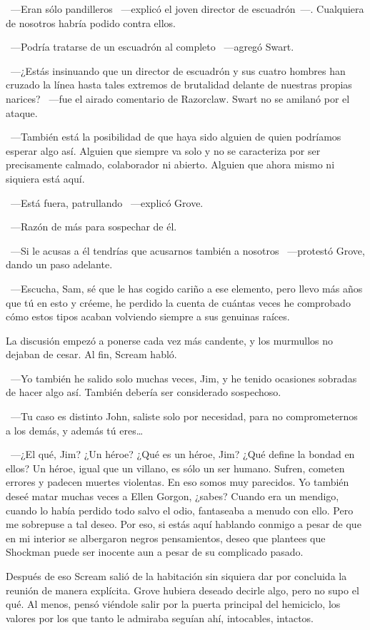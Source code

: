 ~---Eran sólo pandilleros ~---explicó el joven director de escuadrón~---. Cualquiera de nosotros habría podido contra ellos.

~---Podría tratarse de un escuadrón al completo ~---agregó Swart.

~---¿Estás insinuando que un director de escuadrón y sus cuatro hombres han cruzado la línea hasta tales extremos de brutalidad delante de nuestras propias narices? ~---fue el airado comentario de Razorclaw. Swart no se amilanó por el ataque.

~---También está la posibilidad de que haya sido alguien de quien podríamos esperar algo así. Alguien que siempre va solo y no se caracteriza por ser precisamente calmado, colaborador ni abierto. Alguien que ahora mismo ni siquiera está aquí.

~---Está fuera, patrullando ~---explicó Grove.

~---Razón de más para sospechar de él.

~---Si le acusas a él tendrías que acusarnos también a nosotros ~---protestó Grove, dando un paso adelante.

~---Escucha, Sam, sé que le has cogido cariño a ese elemento, pero llevo más años que tú en esto y créeme, he perdido la cuenta de cuántas veces he comprobado cómo estos tipos acaban volviendo siempre a sus genuinas raíces.

La discusión empezó a ponerse cada vez más candente, y los murmullos no dejaban de cesar. Al fin, Scream habló.

~---Yo también he salido solo muchas veces, Jim, y he tenido ocasiones sobradas de hacer algo así. También debería ser considerado sospechoso.

~---Tu caso es distinto John, saliste solo por necesidad, para no comprometernos a los demás, y además tú eres\dots

~---¿El qué, Jim? ¿Un héroe? ¿Qué es un héroe, Jim? ¿Qué define la bondad en ellos? Un héroe, igual que un villano, es sólo un ser humano. Sufren, cometen errores y padecen muertes violentas. En eso somos muy parecidos. Yo también deseé matar muchas veces a Ellen Gorgon, ¿sabes? Cuando era un mendigo, cuando lo había perdido todo salvo el odio, fantaseaba a menudo con ello. Pero me sobrepuse a tal deseo. Por eso, si estás aquí hablando conmigo a pesar de que en mi interior se albergaron negros pensamientos, deseo que plantees que Shockman puede ser inocente aun a pesar de su complicado pasado.

Después de eso Scream salió de la habitación sin siquiera dar por concluida la reunión de manera explícita. Grove hubiera deseado decirle algo, pero no supo el qué. Al menos, pensó viéndole salir por la puerta principal del hemiciclo, los valores por los que tanto le admiraba seguían ahí, intocables, intactos.

